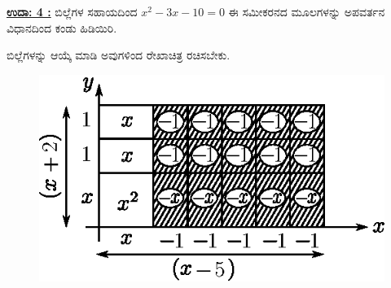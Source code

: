 \noindent
{\textbf{\underline{ಉದಾ: 4 :}}} ಬಿಲ್ಲೆಗಳ ಸಹಾಯದಿಂದ $x^2 - 3x - 10 = 0$ ಈ ಸಮೀಕರನದ ಮೂಲ\break ಗಳನ್ನು ಅಪವರ್ತನ ವಿಧಾನದಿಂದ ಕಂಡು ಹಿಡಿಯಿರಿ. 

ಬಿಲ್ಲೆಗಳನ್ನು ಆಯ್ಕೆ ಮಾಡಿ ಅವುಗಳಿಂದ ರೇಖಾಚಿತ್ರ  ರಚಿಸಬೇಕು.

\vspace{-.3cm}

\begin{figure}[H]
\centering
\includegraphics[scale=0.8]{src/figure/chap3/fig3-54b.eps}
\end{figure}

\vspace{-.4cm}

